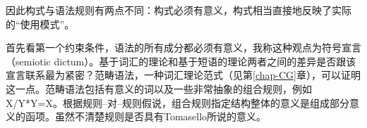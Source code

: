 
\noindent 
因此构式与语法规则有两点不同：构式必须有意义，构式相当直接地反映了实际的“使用模式”。

首先看第一个约束条件，语法的所有成分都必须有意义，我称这种观点为符号宣言（semiotic dictum）。基于词汇的理论和基于短语的理论两者之间的差异是否跟该宣言联系最为紧密？范畴语法，一种词汇理论范式（见第\ref{chap-CG}章），可以证明这一点。范畴语法包括有意义的词以及一些非常抽象的组合规则，例如X/Y*Y=X。根据规则--对--规则假说，组合规则指定结构整体的意义是组成部分意义的函项。虽然不清楚规则是否具有Tomasello所说的意义。

